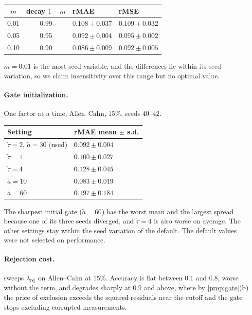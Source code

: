\documentclass[twoside]{article}
\newcommand{\rej}{\lambda_{\mathrm{rej}}}
\begin{document}
\begin{center}\small
\begin{tabular}{ccll}
\toprule
$m$ & decay $1-m$ & rMAE & rMSE \\
\midrule
0.01 & 0.99 & $0.108 \pm 0.037$ & $0.109 \pm 0.032$ \\
0.05 & 0.95 & $0.092 \pm 0.004$ & $0.095 \pm 0.002$ \\
0.10 & 0.90 & $0.086 \pm 0.009$ & $0.092 \pm 0.005$ \\
\bottomrule
\end{tabular}
\end{center}

\noindent
$m = 0.01$ is the most seed-variable, and the differences lie within its seed
variation, so we claim insensitivity over this range but no optimal value.

\paragraph{Gate initialization.}
One factor at a time, Allen--Cahn, $15\%$, seeds $40$--$42$.

\begin{center}\small
\begin{tabular}{ll}
\toprule
Setting & rMAE mean $\pm$ s.d. \\
\midrule
$\tilde\tau = 2$, $\tilde a = 30$ (used) & $0.092 \pm 0.004$ \\
$\tilde\tau = 1$            & $0.100 \pm 0.027$ \\
$\tilde\tau = 4$            & $0.128 \pm 0.045$ \\
$\tilde a = 10$             & $0.083 \pm 0.019$ \\
$\tilde a = 60$             & $0.197 \pm 0.184$ \\
\bottomrule
\end{tabular}
\end{center}

\noindent
The sharpest initial gate ($\tilde a = 60$) has the worst mean and the largest spread
because one of its three seeds diverged, and $\tilde\tau = 4$ is also worse on average.
The other settings stay within the seed variation of the default. The default
values were not selected on performance.

\paragraph{Rejection cost.}
 sweeps $\rej$ on Allen--Cahn at $15\%$. Accuracy is flat
between $0.1$ and $0.8$, worse without the term, and degrades sharply at $0.9$ and above,
where by \cref{prop:gate}(b) the price of exclusion exceeds the squared residuals
near the cutoff and the gate stops excluding corrupted measurements.
\end{document}

